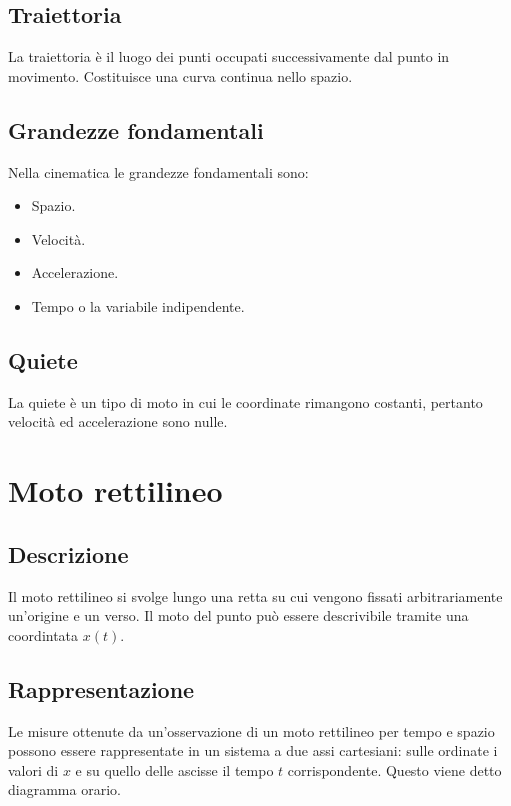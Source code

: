 	\subsection{Traiettoria}
	La traiettoria \`e il luogo dei punti occupati successivamente dal punto in movimento.
	Costituisce una curva continua nello spazio.

	\subsection{Grandezze fondamentali}
	Nella cinematica le grandezze fondamentali sono:
	\begin{multicols}{2}
		\begin{itemize}
			\item Spazio.
			\item Velocit\`a.
			\item Accelerazione.
			\item Tempo o la variabile indipendente.
		\end{itemize}
	\end{multicols}

	\subsection{Quiete}
	La quiete \`e un tipo di moto in cui le coordinate rimangono costanti, pertanto velocit\`a ed accelerazione sono nulle.

\section{Moto rettilineo}

	\subsection{Descrizione}
	Il moto rettilineo si svolge lungo una retta su cui vengono fissati arbitrariamente un'origine e un verso.
	Il moto del punto pu\`o essere descrivibile tramite una coordintata $x(t)$.

	\subsection{Rappresentazione}
	Le misure ottenute da un'osservazione di un moto rettilineo per tempo e spazio possono essere rappresentate in un sistema a due assi cartesiani: sulle ordinate i valori di $x$ e su quello delle ascisse il tempo $t$ corrispondente.
	Questo viene detto diagramma orario.

